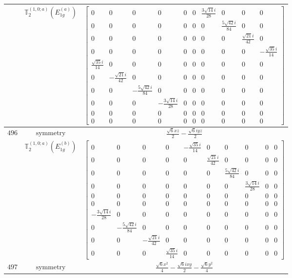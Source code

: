 \documentclass[fleqn,8pt,landscape]{jsarticle}
\begin{document}
\begin{longtable}{ccc}
$  $ & $ \mathbb{T}_{2}^{(1,0;a)}(E_{1g}^{(a)}) $ & $ \begin{bmatrix} 0 & 0 & 0 & 0 & 0 & 0 & \frac{3 \sqrt{14} i}{28} & 0 & 0 & 0 \\ 0 & 0 & 0 & 0 & 0 & 0 & 0 & \frac{5 \sqrt{42} i}{84} & 0 & 0 \\ 0 & 0 & 0 & 0 & 0 & 0 & 0 & 0 & \frac{\sqrt{21} i}{42} & 0 \\ 0 & 0 & 0 & 0 & 0 & 0 & 0 & 0 & 0 & - \frac{\sqrt{35} i}{14} \\ \frac{\sqrt{35} i}{14} & 0 & 0 & 0 & 0 & 0 & 0 & 0 & 0 & 0 \\ 0 & - \frac{\sqrt{21} i}{42} & 0 & 0 & 0 & 0 & 0 & 0 & 0 & 0 \\ 0 & 0 & - \frac{5 \sqrt{42} i}{84} & 0 & 0 & 0 & 0 & 0 & 0 & 0 \\ 0 & 0 & 0 & - \frac{3 \sqrt{14} i}{28} & 0 & 0 & 0 & 0 & 0 & 0 \\ 0 & 0 & 0 & 0 & 0 & 0 & 0 & 0 & 0 & 0 \\ 0 & 0 & 0 & 0 & 0 & 0 & 0 & 0 & 0 & 0 \end{bmatrix} $ \\ \hline
$ 496 $ & $ \text{symmetry} $ & $ \frac{\sqrt{6} x z}{2} - \frac{\sqrt{6} i y z}{2} $ \\
$  $ & $ \mathbb{T}_{2}^{(1,0;a)}(E_{1g}^{(b)}) $ & $ \begin{bmatrix} 0 & 0 & 0 & 0 & - \frac{\sqrt{35} i}{14} & 0 & 0 & 0 & 0 & 0 \\ 0 & 0 & 0 & 0 & 0 & \frac{\sqrt{21} i}{42} & 0 & 0 & 0 & 0 \\ 0 & 0 & 0 & 0 & 0 & 0 & \frac{5 \sqrt{42} i}{84} & 0 & 0 & 0 \\ 0 & 0 & 0 & 0 & 0 & 0 & 0 & \frac{3 \sqrt{14} i}{28} & 0 & 0 \\ 0 & 0 & 0 & 0 & 0 & 0 & 0 & 0 & 0 & 0 \\ 0 & 0 & 0 & 0 & 0 & 0 & 0 & 0 & 0 & 0 \\ - \frac{3 \sqrt{14} i}{28} & 0 & 0 & 0 & 0 & 0 & 0 & 0 & 0 & 0 \\ 0 & - \frac{5 \sqrt{42} i}{84} & 0 & 0 & 0 & 0 & 0 & 0 & 0 & 0 \\ 0 & 0 & - \frac{\sqrt{21} i}{42} & 0 & 0 & 0 & 0 & 0 & 0 & 0 \\ 0 & 0 & 0 & \frac{\sqrt{35} i}{14} & 0 & 0 & 0 & 0 & 0 & 0 \end{bmatrix} $ \\ \hline
$ 497 $ & $ \text{symmetry} $ & $ \frac{\sqrt{6} x^{2}}{4} - \frac{\sqrt{6} i x y}{2} - \frac{\sqrt{6} y^{2}}{4} $ \\

\end{longtable}
\end{document}
